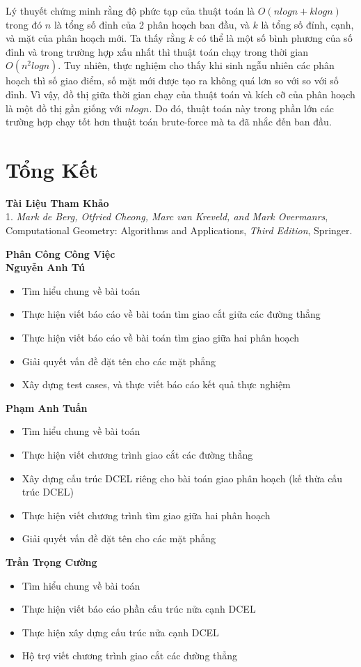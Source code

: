\documentclass[15pt]{article}
\begin{document}
{Lý thuyết chứng minh rằng độ phức tạp của thuật toán là $O(n log n + k log n)$ trong đó $n$ là tổng số đỉnh của 2 phân hoạch ban đầu, và $k$ là tổng số đỉnh, cạnh, và mặt của phân hoạch mới. Ta thấy rằng $k$ có thể là một số bình phương của số đỉnh và trong trường hợp xấu nhất thì thuật toán chạy trong thời gian $O(n^2 log n)$. Tuy nhiên, thực nghiệm cho thấy khi sinh ngẫu nhiên các phân hoạch thì số giao điểm, số mặt mới được tạo ra không quá lơn so với so với số đỉnh. Vì vậy, đồ thị giữa thời gian chạy của thuật toán và kích cỡ của phân hoạch là một đồ thị gần giống với $n log n$. Do đó, thuật toán này trong phần lớn các trường hợp chạy tốt hơn thuật toán brute-force mà ta đã nhắc đến ban đầu.
\newpage
\section{Tổng Kết}
\textbf{Tài Liệu Tham Khảo} \\
1. \textit{ Mark de Berg, Otfried Cheong, Marc van Kreveld, and Mark Overmanrs}, Computational Geometry: Algorithms and Applications, \textit{Third Edition}, Springer. \\[1.5cm]}

\newpage

\textbf{Phân Công Công Việc} \\
\textbf{Nguyễn Anh Tú}
\begin{itemize}
\item Tìm hiểu chung về bài toán
\item Thực hiện viết báo cáo về bài toán tìm giao cắt giữa các đường thẳng
\item Thực hiện viết báo cáo về bài toán tìm giao giữa hai phân hoạch
\item Giải quyết vấn đề đặt tên cho các mặt phẳng
\item Xây dựng test cases, và thực viết báo cáo kết quả thực nghiệm
\end{itemize}
\textbf{Phạm Anh Tuấn}
\begin{itemize}
\item Tìm hiểu chung về bài toán
\item Thực hiện viết chương trình giao cắt các đường thẳng
\item Xây dựng cấu trúc DCEL riêng cho bài toán giao phân hoạch (kế thừa cấu trúc DCEL)
\item Thực hiện viết chương trình tìm giao giữa hai phân hoạch
\item Giải quyết vấn đề đặt tên cho các mặt phẳng
\end{itemize}
\textbf{Trần Trọng Cường}
\begin{itemize}
\item Tìm hiểu chung về bài toán
\item Thực hiện viết báo cáo phần cấu trúc nửa cạnh DCEL
\item Thực hiện xây dựng cấu trúc nửa cạnh DCEL
\item Hộ trợ viết chương trình giao cắt các đường thẳng
\end{itemize}
\end{document}
